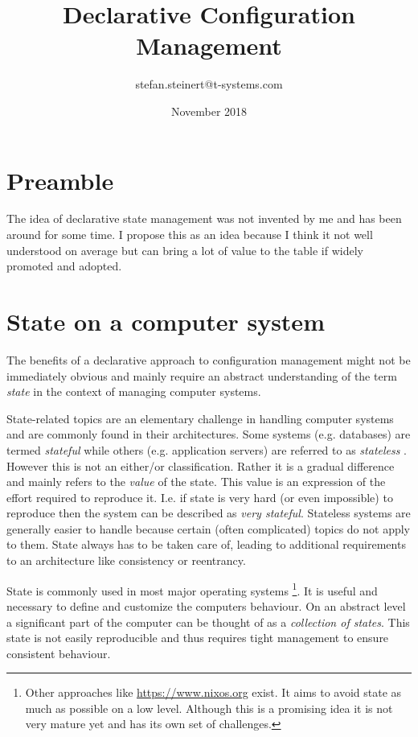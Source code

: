 \documentclass[12pt, a4paper]{article}
\title{Declarative Configuration Management}
\author{stefan.steinert@t-systems.com}
\date{November 2018}
\begin{document}
\maketitle

\tableofcontents

\clearpage

\section{Preamble}
The idea of declarative state management was not invented by me and has been around for some time. I propose this as an idea because I think it not well understood on average but can bring a lot of value to the table if widely promoted and adopted.

\section{State on a computer system}
The benefits of a declarative approach to configuration management might not be immediately obvious and mainly require an abstract understanding of the term \textit{state} in the context of managing computer systems.

State-related topics are an elementary challenge in handling computer systems and are commonly found in their architectures. Some systems (e.g. databases) are termed \textit{stateful} while others (e.g. application servers) are referred to as \textit{stateless} . However this is not an either/or classification. Rather it is a gradual difference and mainly refers to the \textit{value} of the state. This value is an expression of the effort required to reproduce it. I.e. if state is very hard (or even impossible) to reproduce then the system can be described as \textit{very stateful}. Stateless systems are generally easier to handle because certain (often complicated) topics do not apply to them. State always has to be taken care of, leading to additional requirements to an architecture like consistency or reentrancy.

State is commonly used in most major operating systems \footnote{Other approaches like \url{https://www.nixos.org} exist. It aims to avoid state as much as possible on a low level. Although this is a promising idea it is not very mature yet and has its own set of challenges.}. It is useful and necessary to define and customize the computers behaviour. On an abstract level a significant part of the computer can be thought of as a \textit{collection of states}. This state is not easily reproducible and thus requires tight management to ensure consistent behaviour.
\end{document}
